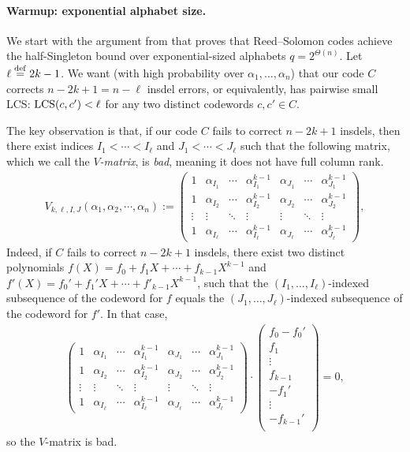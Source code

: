 \documentclass[11pt]{article}
\newcommand\defeq{\ensuremath{\stackrel{\rm def}{=}}}
\theoremstyle{plain}
\theoremstyle{definition}
\theoremstyle{remark}
\newcommand\LCS{\textup{LCS}}
\begin{document}
\paragraph{Warmup: exponential alphabet size.} 
We start with the argument from \cite{con2023reed} that proves that Reed--Solomon codes achieve the half-Singleton bound over exponential-sized alphabets $q=2^{\Theta(n)}$.
Let $\ell\defeq 2k-1$.
We want (with high probability over $\alpha_1,\dots,\alpha_n$) that our code $C$ corrects $n-2k+1=n-\ell$ insdel errors, or equivalently, has pairwise small LCS: $\LCS(c,c') < \ell$ for any two distinct codewords $c,c'\in C$.

The key observation is that, if our code $C$ fails to correct $n-2k+1$ insdels, then there exist indices $I_1<\cdots<I_\ell$ and $J_1<\cdots<J_\ell$ such that the following matrix, which we call the \emph{$V$-matrix}, is \emph{bad}, meaning it does not have full column rank.
\begin{align}
    V_{k,\ell,I,J}(\alpha_1,\alpha_2,\cdots,\alpha_n):=\left(\begin{array}{ccccccc}1 & \alpha_{I_1} & \cdots & \alpha_{I_1}^{k-1} & \alpha_{J_1} & \cdots & \alpha_{J_1}^{k-1} \\1 & \alpha_{I_2} & \cdots & \alpha_{I_2}^{k-1} & \alpha_{J_2} & \cdots & \alpha_{J_2}^{k-1} \\ \vdots& \vdots & \ddots& \vdots & \vdots & \ddots & \vdots \\1 & \alpha_{I_\ell} & \cdots & \alpha_{I_\ell}^{k-1} & \alpha_{J_\ell} & \cdots & \alpha_{J_\ell}^{k-1}\end{array}\right),
\end{align}
Indeed, if $C$ fails to correct $n-2k+1$ insdels, there exist two distinct polynomials $f(X)=f_0+f_1X+\cdots+f_{k-1}X^{k-1}$ and $f'(X) = f_0'+f_1'X+\cdots+f'_{k-1}X^{k-1}$, such that the $(I_1,\dots,I_\ell)$-indexed subsequence of the codeword for $f$ equals the $(J_1,\dots,J_\ell)$-indexed subsequence of the codeword for $f'$. In that case, 
\begin{align}
\left(\begin{array}{ccccccc}1 & \alpha_{I_1} & \cdots & \alpha_{I_1}^{k-1} & \alpha_{J_1} & \cdots & \alpha_{J_1}^{k-1} \\1 & \alpha_{I_2} & \cdots & \alpha_{I_2}^{k-1} & \alpha_{J_2} & \cdots & \alpha_{J_2}^{k-1} \\ \vdots& \vdots & \ddots& \vdots & \vdots & \ddots & \vdots \\1 & \alpha_{I_\ell} & \cdots & \alpha_{I_\ell}^{k-1} & \alpha_{J_\ell} & \cdots & \alpha_{J_\ell}^{k-1}\end{array}\right)
    \cdot\begin{pmatrix}
        f_0-f_0'\\
        f_1\\
        \vdots\\
        f_{k-1}\\
        -f_1'\\
        \vdots\\
        -f_{k-1}'\\
    \end{pmatrix}
    =0,
\end{align}
so the $V$-matrix is bad.
\end{document}
